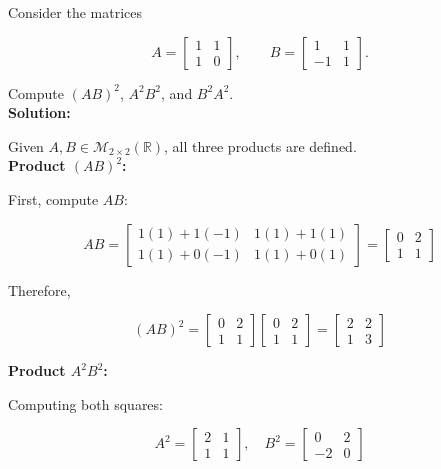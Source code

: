 \item Consider the matrices

$$
A = \begin{bmatrix}
    1 & 1 \\
    1 & 0
\end{bmatrix},
\qquad
B = \begin{bmatrix}
    1 & 1 \\
    -1 & 1
\end{bmatrix}.
$$

Compute $(AB)^2$, $A^2B^2$, and $B^2A^2$.\\[0.5em]

\textbf{Solution:}

\begin{answer}
    Given $A,B \in \mathcal{M}_{2\times2}(\mathbb{R})$, all three products are defined.\\[0.5em]

    \textbf{Product $(AB)^2$:}

    First, compute $AB$:

    $$
        AB = \begin{bmatrix}
            1(1)+1(-1) & 1(1)+1(1) \\
            1(1)+0(-1) & 1(1)+0(1)
        \end{bmatrix} = \begin{bmatrix}
            0 & 2 \\
            1 & 1
        \end{bmatrix}
    $$

    Therefore,

    $$
        (AB)^2 = \begin{bmatrix}
            0 & 2 \\
            1 & 1
        \end{bmatrix}
        \begin{bmatrix}
            0 & 2 \\
            1 & 1
        \end{bmatrix} = \boxed{\begin{bmatrix}
            2 & 2 \\
            1 & 3
        \end{bmatrix}}
    $$

    \textbf{Product $A^2B^2$:}

    Computing both squares:

    $$
        A^2 = \begin{bmatrix}
            2 & 1 \\
            1 & 1
        \end{bmatrix}, \quad
        B^2 = \begin{bmatrix}
            0 & 2 \\
            -2 & 0
        \end{bmatrix}
    $$


\end{answer}

